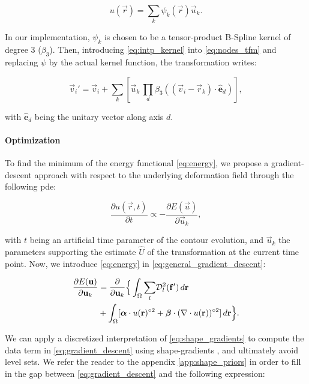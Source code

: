  \begin{equation}
  u(\vec{r}) = \sum_k \psi_k(\vec{r}) \vec{u}_k.
  \label{eq:intp_kernel}
  \end{equation}

In our implementation, $\psi_k$ is chosen to be a tensor-product B-Spline kernel
  of degree 3 ($\beta_3$).
Then, introducing \eqref{eq:intp_kernel} into \eqref{eq:nodes_tfm} and replacing
  $\psi$ by the actual kernel function, the transformation writes:

  \begin{equation}
    \vec{v}_i' = \vec{v}_i + \sum_k \left[ \vec{u}_k \, \underset{d}{\prod}
      \beta_3( (\vec{v}_i - \vec{r}_k) \cdot \hat{\mathbf{e}}_d ) \right],
  \label{eq:transformation}
  \end{equation}

  with $\hat{\mathbf{e}}_d$ being the unitary vector along axis $d$.


\paragraph*{Optimization}
\label{sec:gradient_descent}
To find the minimum of the energy functional \eqref{eq:energy},
  we propose a gradient-descent approach with respect to the underlying
  deformation field through the following \gls*{pde}:

  \begin{equation}
  \frac{\partial u(\vec{r},t)}{\partial t} \propto - \frac{\partial E(\vec{u})}{\partial \vec{u}_k},
  \label{eq:general_gradient_descent}
  \end{equation}

  with $t$ being an artificial time parameter of the contour
  evolution, and $\vec{u}_k$ the parameters supporting the estimate
  $\hat{U}$ of the transformation at the current time point.
Now, we introduce \eqref{eq:energy} in \eqref{eq:general_gradient_descent}:

  \begin{align}
  \frac{\partial E(\vec{u})}{\partial \vec{u}_k} &=
  \frac{ \partial }{\partial \vec{u}_k} \Big\{
  \int_{\Omega} \underset{l}{\sum} \mdist{f'}{l} \,d\vec{r} \notag\\
  &+ \int_{\Omega} [ \boldsymbol{\alpha} \cdot u(\vec{r})^{\circ2}
  + \boldsymbol{\beta} \cdot (\nabla \cdot u(\vec{r}))^{\circ2} ] \,d\vec{r}
  \Big\}.
  \label{eq:gradient_descent}
  \end{align}


We can apply a discretized interpretation of \eqref{eq:shape_gradients} to compute
  the data term in \eqref{eq:gradient_descent} using shape-gradients
  \citep{herbulot_segmentation_2006}, and ultimately avoid level sets.
We refer the reader to the appendix \autoref{app:shape_priors} in order to fill in the gap
  between \eqref{eq:gradient_descent} and the following expression:

